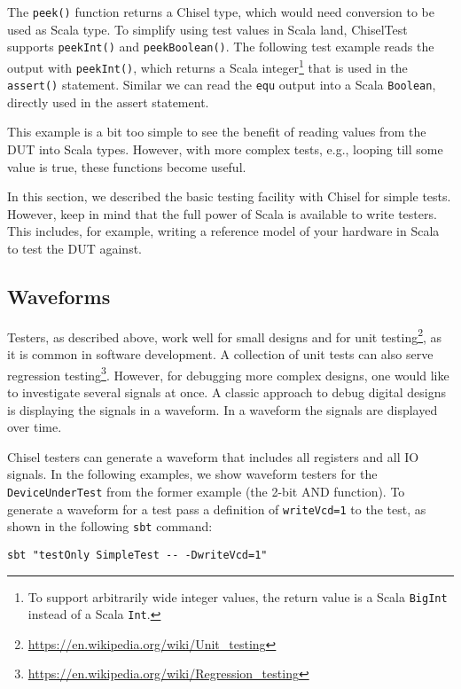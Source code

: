 \documentclass[%
    10pt,
    headinclude, footexclude,
    openright, %
    notitlepage,
    cleardoubleempty,
    headsepline,
    pointlessnumbers,
    bibtotoc, idxtotoc,
    ]{scrbook}
\newcommand{\code}[1]{{\lstinline[basicstyle=\small\ttfamily]{#1}}}
\newcommand{\codefoot}[1]{{\lstinline[basicstyle=\footnotesize\ttfamily]{#1}}}
\newcommand{\myref}[2]{\href{#1}{#2}}
\renewcommand{\myref}[2]{{#2}{\footnote{\url{#1}}}}
\begin{document}
The \code{peek()} function returns a Chisel type, which would need conversion to be used
as Scala type. To simplify using test values in Scala land, ChiselTest supports \code{peekInt()}
and \code{peekBoolean()}. The following test example reads the output with \code{peekInt()},
which returns a Scala integer\footnote{To support arbitrarily wide integer values, the
return value is a Scala \codefoot{BigInt} instead of a Scala \codefoot{Int}.}
that is used in the \code{assert()} statement.
Similar we can read the \code{equ} output into a Scala \code{Boolean}, directly
used in the assert statement.


This example is a bit too simple to see the benefit of reading values from the DUT
into Scala types. However, with more complex tests, e.g., looping till some value is true,
these functions become useful.

In this section, we described the basic testing facility with Chisel for simple tests.
However, keep in mind that the full power of Scala is available to write testers.
This includes, for example, writing a reference model of your hardware in Scala to
test the DUT against.

\subsection{Waveforms}



Testers, as described above, work well for small designs and for
\myref{https://en.wikipedia.org/wiki/Unit_testing}{unit testing}, as it is common in
software development. A collection of unit tests can also serve
\myref{https://en.wikipedia.org/wiki/Regression_testing}{regression testing}. However, 
for debugging more complex designs, one would like to investigate several signals at 
once. A classic approach to debug digital designs is displaying the signals in a 
waveform. In a waveform the signals are displayed over time.

\noindent Chisel testers can generate a waveform that includes all registers and all
IO signals. In the following examples, we show waveform testers for the
\code{DeviceUnderTest} from the former example (the 2-bit AND function).
To generate a waveform for a test pass a definition of \code{writeVcd=1} to
the test, as shown in the following \code{sbt} command:

\begin{verbatim}
sbt "testOnly SimpleTest -- -DwriteVcd=1"
\end{verbatim}
\end{document}
